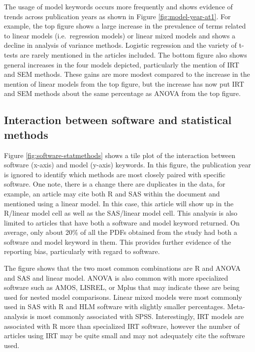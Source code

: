 \documentclass[english,,man]{apa6}
\theoremstyle{definition}
\theoremstyle{definition}
\theoremstyle{definition}
\theoremstyle{remark}
\begin{document}
The usage of model keywords occurs more frequently and shows evidence of
trends across publication years as shown in Figure
\ref{fig:model-year-at1}. For example, the top figure shows a large
increase in the prevalence of terms related to linear models
(i.e.~regression models) or linear mixed models and shows a decline in
analysis of variance methods. Logistic regression and the variety of
t-tests are rarely mentioned in the articles included. The bottom figure
also shows general increases in the four models depicted, particularly
the mention of IRT and SEM methods. These gains are more modest compared
to the increase in the mention of linear models from the top figure, but
the increase has now put IRT and SEM methods about the same percentage
as ANOVA from the top figure.

\hypertarget{interaction-between-software-and-statistical-methods}{%
\subsection{Interaction between software and statistical
methods}\label{interaction-between-software-and-statistical-methods}}

Figure \ref{fig:software-statmethods} shows a tile plot of the
interaction between software (x-axis) and model (y-axis) keywords. In
this figure, the publication year is ignored to identify which methods
are most closely paired with specific software. One note, there is a
change there are duplicates in the data, for example, an article may
cite both R and SAS within the document and mentioned using a linear
model. In this case, this article will show up in the R/linear model
cell as well as the SAS/linear model cell. This analysis is also limited
to articles that have both a software and model keyword returned. On
average, only about 20\% of all the PDFs obtained from the study had
both a software and model keyword in them. This provides further
evidence of the reporting bias, particularly with regard to software.

The figure shows that the two most common combinations are R and ANOVA
and SAS and linear model. ANOVA is also common with more specialized
software such as AMOS, LISREL, or Mplus that may indicate these are
being used for nested model comparisons. Linear mixed models were most
commonly used in SAS with R and HLM software with slightly smaller
percentages. Meta-analysis is most commonly associated with SPSS.
Interestingly, IRT models are associated with R more than specialized
IRT software, however the number of articles using IRT may be quite
small and may not adequately cite the software used.
\end{document}
